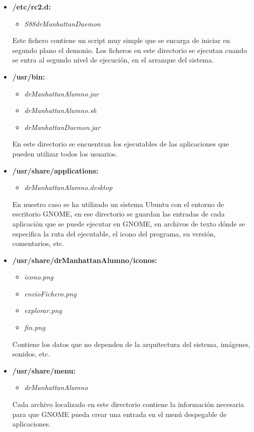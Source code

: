 \begin{itemize}

    \item {\bfseries /etc/rc2.d:}
    \begin{itemize}
        \item \emph{S88drManhattanDaemon}
    \end{itemize}

    Este fichero contiene un script muy simple que se encarga de iniciar en segundo plano el demonio. Los ficheros en este directorio se ejecutan cuando se entra al segundo nivel de ejecución, en el arranque del sistema.


    \item {\bfseries /usr/bin:}
    \begin{itemize}
        \item \emph{drManhattanAlumno.jar}
        \item \emph{drManhattanAlumno.sh}
        \item \emph{drManhattanDaemon.jar}
    \end{itemize}

    En este directorio se encuentran los ejecutables de las aplicaciones que pueden utilizar todos los usuarios.

    \item {\bfseries /usr/share/applications:}
    \begin{itemize}
        \item \emph{drManhattanAlumno.desktop}
    \end{itemize}

    En nuestro caso se ha utilizado un sistema Ubuntu con el entorno de escritorio GNOME, en ese directorio se guardan las entradas de cada aplicación que se puede ejecutar en GNOME, en archivos de texto dónde se especifica la ruta del ejecutable, el icono del programa, su versión, comentarios, etc.


    \item {\bfseries /usr/share/drManhattanAlumno/iconos:}
    \begin{itemize}
        \item \emph{icono.png}
        \item \emph{envioFichero.png}
        \item \emph{explorar.png}
        \item \emph{fin.png}
    \end{itemize}

    Contiene los datos que no dependen de la arquitectura del sistema, imágenes, sonidos, etc.

    \item {\bfseries /usr/share/menu:}
        \begin{itemize}
            \item \emph{drManhattanAlumno}
        \end{itemize}

    Cada archivo localizado en este directorio contiene la información necesaria para que GNOME pueda crear una entrada en el menú despegable de aplicaciones.
    

\end{itemize}
